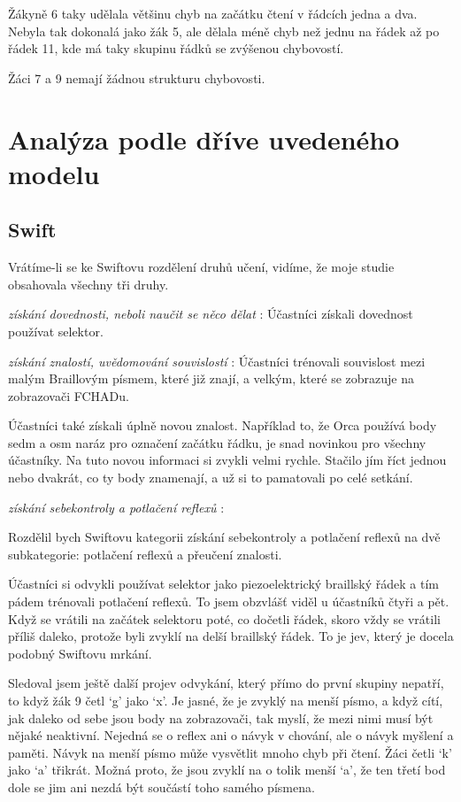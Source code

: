 Žákyně 6 taky udělala většinu chyb na začátku čtení v řádcích jedna a dva.  Nebyla tak dokonalá jako žák 5, ale dělala méně chyb než jednu na řádek až po řádek 11, kde má taky skupinu řádků se zvýšenou chybovostí.

Žáci 7 a 9 nemají žádnou strukturu chybovosti.

\section{Analýza podle dříve uvedeného modelu}

\subsection{Swift}
Vrátíme-li se ke Swiftovu rozdělení druhů učení, vidíme, že moje studie obsahovala všechny tři druhy.

\textit{získání dovednosti, neboli naučit se něco dělat} :
Účastníci získali dovednost používat selektor.

\textit{získání znalostí, uvědomování souvislostí} :
Účastníci trénovali souvislost mezi malým Braillovým písmem, které již znají, a velkým, které se zobrazuje na zobrazovači FCHADu.

Účastníci také získali úplně novou znalost.  Například to, že Orca používá body sedm a osm naráz pro označení začátku řádku, je snad novinkou pro všechny účastníky.  Na tuto novou informaci si zvykli velmi rychle.  Stačilo jím říct jednou nebo dvakrát, co ty body znamenají, a už si to pamatovali po celé setkání.


\textit{získání sebekontroly a potlačení reflexů } :

Rozdělil bych Swiftovu kategorii získání sebekontroly a potlačení reflexů na dvě subkategorie:  potlačení reflexů a přeučení znalosti.

Účastníci si odvykli používat selektor jako piezoelektrický braillský řádek a tím pádem trénovali potlačení reflexů.  To jsem obzvlášť viděl u účastníků čtyři a pět.  Když se vrátili na začátek selektoru poté, co dočetli řádek, skoro vždy se vrátili příliš daleko, protože byli zvyklí na delší braillský řádek.  To je jev, který je docela podobný Swiftovu mrkání.

Sledoval jsem ještě další projev odvykání, který přímo do první skupiny nepatří, to když žák 9 četl `g' jako `x'. Je jasné, že je zvyklý na menší písmo, a když cítí, jak daleko od sebe jsou body na zobrazovači, tak myslí, že mezi nimi musí být nějaké neaktivní.  Nejedná se o reflex ani o návyk v chování, ale o návyk myšlení a paměti.  Návyk na menší písmo může vysvětlit mnoho chyb při čtení.  Žáci četli `k' jako `a' třikrát. Možná proto, že jsou zvyklí na o tolik menší `a', že ten třetí bod dole se jim ani nezdá být součástí toho samého písmena.

